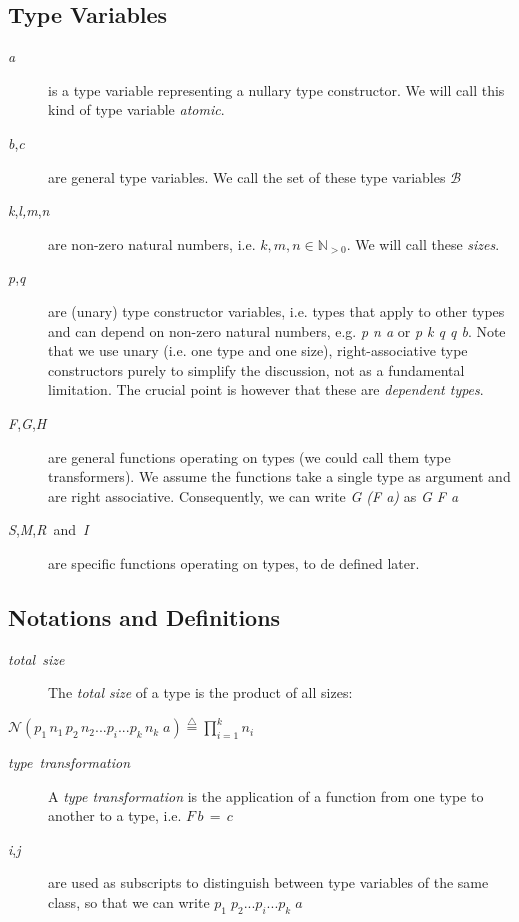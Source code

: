 \documentclass{article}
\begin{document}
\subsection{Type Variables}
\begin{description}
\item [{\emph{a}}] is a type variable representing a nullary type constructor.
We will call this kind of type variable \emph{atomic}.
\item [{\emph{b},\emph{c}}] are general type variables. We call the set
of these type variables $\mathcal{B}$
\item [{\emph{k},\emph{l,m},\emph{n}}] are non-zero natural numbers, i.e.
$k,m,n\in\mathbb{N}_{>0}$. We will call these \emph{sizes}.
\item [{\emph{p},\emph{q}}] are (unary) type constructor variables, i.e.
types that apply to other types and can depend on non-zero natural
numbers, e.g. \emph{p n a} or \emph{p k q q b}. Note that we use unary
(i.e. one type and one size), right-associative type constructors
purely to simplify the discussion, not as a fundamental limitation.
The crucial point is however that these are \emph{dependent types}. 
\item [{\emph{F},\emph{G},\emph{H}}] are general functions operating on
types (we could call them type transformers). We assume the functions
take a single type as argument and are right associative. Consequently,
we can write \emph{G (F a)} as \emph{G F a}
\item [{\emph{S},\emph{M},\emph{R}~and~\emph{I}}] are specific functions
operating on types, to de defined later.
\end{description}

\subsection{Notations and Definitions}
\begin{description}
\item [{\emph{total~size}}] The \emph{total size} of a type is the product
of all sizes:
\end{description}
$\mathcal{N}(p_{1}\, n_{1}\, p_{2}\, n_{2}...p_{i}...p_{k}\, n_{k}\; a)\overset{{\scriptscriptstyle \triangle}}{=}\prod_{i=1}^{k}n_{i}$
\begin{description}
\item [{\emph{type~transformation}}] A \emph{type transformation} is the
application of a function from one type to another to a type, i.e.
$F\, b\,=\, c$
\item [{\emph{i},\emph{j}}] are used as subscripts to distinguish between
type variables of the same class, so that we can write $p_{1}\; p_{2}...p_{i}...p_{k}\; a$
\end{description}
\end{document}
